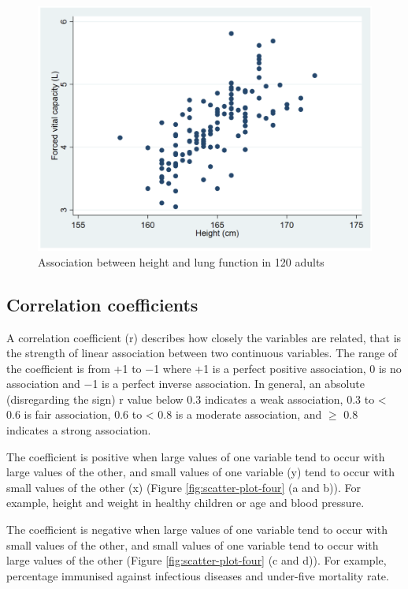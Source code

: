 \documentclass[
]{memoir}
\begin{document}
\begin{figure}
\includegraphics[width=0.66\linewidth]{img/mod08/scatterpng} \caption{Association between height and lung function in 120 adults}\label{fig:scatter-plot}
\end{figure}

\hypertarget{correlation-coefficients}{%
\subsection{Correlation coefficients}\label{correlation-coefficients}}

A correlation coefficient (r) describes how closely the variables are related, that is the strength of linear association between two continuous variables. The range of the coefficient is from +1 to −1 where +1 is a perfect positive association, 0 is no association and −1 is a perfect inverse association. In general, an absolute (disregarding the sign) r value below 0.3 indicates a weak association, 0.3 to \textless{} 0.6 is fair association, 0.6 to \textless{} 0.8 is a moderate association, and \(\ge\) 0.8 indicates a strong association.

The coefficient is positive when large values of one variable tend to occur with large values of the other, and small values of one variable (y) tend to occur with small values of the other (x) (Figure \ref{fig:scatter-plot-four} (a and b)). For example, height and weight in healthy children or age and blood pressure.

The coefficient is negative when large values of one variable tend to occur with small values of the other, and small values of one variable tend to occur with large values of the other (Figure \ref{fig:scatter-plot-four} (c and d)). For example, percentage immunised against infectious diseases and under-five mortality rate.
\end{document}
